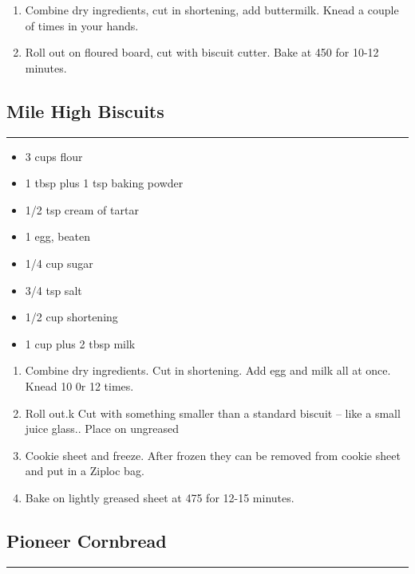 \documentclass{article}
\begin{document}
\begin{enumerate}
    \item
        Combine dry ingredients, cut in shortening, add buttermilk.  Knead a couple of times in your hands.
    \item
        Roll out on floured board, cut with biscuit cutter. Bake at 450 for 10-12 minutes.
\end{enumerate}
\newpage

\subsection{Mile High Biscuits} 
\noindent\rule[0.5ex]{\linewidth}{1pt}

\begin{framed}
    \begin{itemize}
        \item 3 cups flour
        \item 1 tbsp plus 1 tsp baking powder
        \item 1/2 tsp cream of tartar
        \item 1 egg, beaten 
        \item 1/4 cup sugar
        \item 3/4 tsp salt
        \item 1/2 cup shortening
        \item 1 cup plus 2 tbsp milk
    \end{itemize}
\end{framed}

\begin{enumerate}
    \item
        Combine dry ingredients. Cut in shortening. Add egg and milk all at once. Knead 10 0r 12 times.
    \item
        Roll out.k Cut with something smaller than a standard biscuit – like a small juice glass.. Place on ungreased
    \item
        Cookie sheet and freeze. After frozen they can be removed from cookie sheet and put in a Ziploc bag.
    \item
        Bake on lightly greased sheet at 475 for 12-15 minutes.
\end{enumerate}
\newpage

\subsection{Pioneer Cornbread} 
\noindent\rule[0.5ex]{\linewidth}{1pt}
\end{document}
